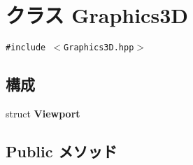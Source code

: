 \hypertarget{classm3g_1_1Graphics3D}{
\section{クラス Graphics3D}
\label{classm3g_1_1Graphics3D}
}
{\tt \#include $<$Graphics3D.hpp$>$}

\subsection*{構成}
\begin{CompactItemize}
\item 
struct \textbf{Viewport}
\end{CompactItemize}
\subsection*{Public メソッド}
